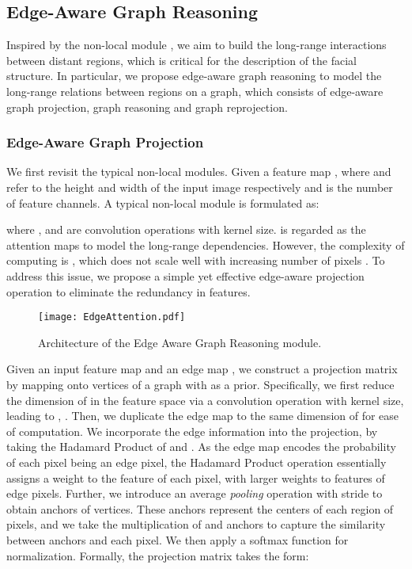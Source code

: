 \documentclass[runningheads]{llncs}
\begin{document}
\subsection{Edge-Aware Graph Reasoning}\label{sec3.2}

Inspired by the non-local module \cite{wang2018non}, we aim to build the long-range interactions between distant regions, which is critical for the description of the facial structure. 
In particular, we propose edge-aware graph reasoning to model the long-range relations between regions on a graph, which consists of edge-aware graph projection, graph reasoning and graph reprojection.  



\subsubsection{Edge-Aware Graph Projection}
\label{subsubsec:projection}

We first revisit the typical non-local modules. 
Given a feature map ,  where  and  refer to the height and width of the input image respectively and  is the number of feature channels. 
A typical non-local module is formulated as:

where ,  and  are convolution operations with  kernel size. 
 is regarded as the attention maps to model the long-range dependencies. 
However, the complexity of computing  is , which does not scale well with increasing number of pixels . 
To address this issue, we propose a simple yet effective edge-aware projection operation to eliminate the redundancy in features.

\begin{figure}[t]
    \centering
    \texttt{[image: EdgeAttention.pdf]}
\caption{Architecture of the Edge Aware Graph Reasoning module.}
        \label{fig:module}
\end{figure}

Given an input feature map  and an edge map , we construct a projection matrix  by mapping  onto vertices of a graph with  as a prior. 
Specifically, we first reduce the dimension of  in the feature space via a convolution operation  with  kernel size, leading to , . 
Then, we duplicate the edge map  to the same dimension of  for ease of computation. 
We incorporate the edge information into the projection, by taking the Hadamard Product of  and . 
As the edge map  encodes the probability of each pixel being an edge pixel, the Hadamard Product operation essentially assigns a weight to the feature of each pixel, with larger weights to features of edge pixels. 
Further,  we introduce an average {\it pooling} operation  with stride  to obtain anchors of vertices. 
These anchors represent the centers of each region of pixels, and we take the multiplication of  and anchors to capture the similarity between anchors and each pixel. 
We then apply a softmax function for normalization. 
Formally, the projection matrix takes the form:
\end{document}
